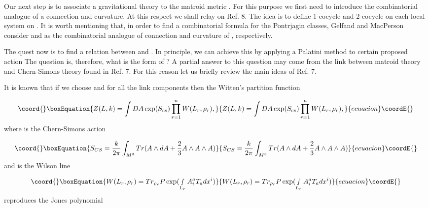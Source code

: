 \documentclass[a4paper,12pt]{article}
\begin{document}
Our next step is to associate a gravitational theory to the matroid metric \coordHE{}. For this purpose we first need to introduce the
combinatorial analogue of a connection and curvature. At this respect we
shall relay on Ref. 8. The idea is to define 1-cocycle \myHighlight{$\Theta $}\coordHE{} and
2-cocycle \myHighlight{$\rho ^{\ast }\Omega =\delta \Theta $}\coordHE{} on each local system on \coordHE{}. It is worth mentioning that, in order to find a combinatorial
formula for the Pontrjagin classes, Gelfand and MacPerson consider \myHighlight{$\Theta $}\coordHE{}
and \myHighlight{$\Omega $}\coordHE{} as the combinatorial analogue of connection and curvature of \coordHE{}, respectively.

The quest now is to find a relation between \coordHE{} and \myHighlight{$\Omega $}\coordHE{}. In
principle, we can achieve this by applying a Palatini method to certain
proposed action \coordHE{} The question is, therefore, what
is the form of \coordHE{}? A partial answer to this question
may come from the link between matroid theory and Chern-Simons theory found
in Ref. 7. For this reason let us briefly review the main ideas of Ref. 7.

It is known that if we choose \coordHE{}  \coordHE{} and \coordHE{}
for all the link components then the Witten's partition function

\begin{equation}\coord{}\boxEquation{
Z(L,k)=\int DA\exp (S_{cs})\prod\limits_{r=1}^{n}W(L_{r},\rho _{r}),
\label{31}
}{
Z(L,k)=\int DA\exp (S_{cs})\prod\limits_{r=1}^{n}W(L_{r},\rho _{r}),
}{ecuacion}\coordE{}\end{equation}
where \coordHE{} is the Chern-Simons action

\begin{equation}\coord{}\boxEquation{
S_{CS}=\frac{k}{2\pi }\int_{M^{3}}Tr(A\wedge dA+\frac{2}{3}A\wedge A\wedge A)
\label{32}
}{
S_{CS}=\frac{k}{2\pi }\int_{M^{3}}Tr(A\wedge dA+\frac{2}{3}A\wedge A\wedge A)
}{ecuacion}\coordE{}\end{equation}
and \coordHE{} is the Wilson line

\begin{equation}\coord{}\boxEquation{
W(L_{r},\rho _{r})=Tr_{\rho _{r}}P\exp (\smallint
_{L_{r}}A_{i}^{a}T_{a}dx^{i})  \label{33}
}{
W(L_{r},\rho _{r})=Tr_{\rho _{r}}P\exp (\smallint
_{L_{r}}A_{i}^{a}T_{a}dx^{i})  }{ecuacion}\coordE{}\end{equation}
reproduces the Jones polynomial
\end{document}
